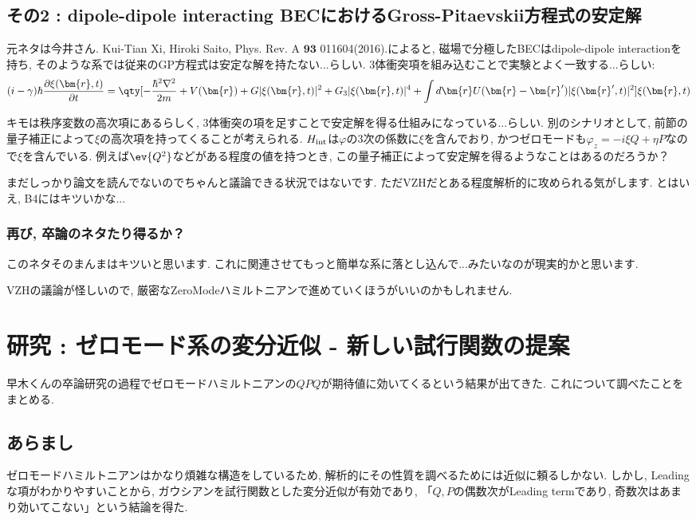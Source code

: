 \documentclass[10.5pt,a4paper]{jreport}
\begin{document}
\section{その2 : dipole-dipole interacting BECにおけるGross-Pitaevskii方程式の安定解}
元ネタは今井さん. {\rm Kui-Tian Xi, Hiroki Saito,  Phys. Rev. A $\bm{93}$ 011604(2016).}によると, 磁場で分極したBECはdipole-dipole interactionを持ち, そのような系では従来のGP方程式は安定な解を持たない...らしい. 3体衝突項を組み込むことで実験とよく一致する...らしい:
\begin{eqnarray}
  (i-\gamma )\hbar\frac{\partial \xi (\bm{r}, t)}{\partial t} = \qty[-\frac{\hbar^2\nabla^2}{2m} + V(\bm{r}) + G|\xi (\bm{r}, t)|^2 + G_3|\xi (\bm{r}, t)|^4 + \int d\bm{r} U(\bm{r} - \bm{r}')|\xi (\bm{r}', t)|^2]\xi (\bm{r}, t)
\end{eqnarray}

キモは秩序変数の高次項にあるらしく, 3体衝突の項を足すことで安定解を得る仕組みになっている...らしい. 別のシナリオとして, 前節の量子補正によって$\xi$の高次項を持ってくることが考えられる. $H_{\rm int}$は$\varphi$の3次の係数に$\xi$を含んでおり, かつゼロモードも$\varphi_z = -i\xi Q + \eta P$なので$\xi$を含んでいる. 例えば$\ev{Q^2}$などがある程度の値を持つとき, この量子補正によって安定解を得るようなことはあるのだろうか？

まだしっかり論文を読んでないのでちゃんと議論できる状況ではないです. ただVZHだとある程度解析的に攻められる気がします. とはいえ, B4にはキツいかな...
\subsection{再び, 卒論のネタたり得るか？}
このネタそのまんまはキツいと思います. これに関連させてもっと簡単な系に落とし込んで...みたいなのが現実的かと思います.

VZHの議論が怪しいので, 厳密なZeroModeハミルトニアンで進めていくほうがいいのかもしれません. 

\newpage

\chapter{研究 : ゼロモード系の変分近似 - 新しい試行関数の提案}
早木くんの卒論研究の過程でゼロモードハミルトニアンの$QPQ$が期待値に効いてくるという結果が出てきた. これについて調べたことをまとめる. 
\section{あらまし}
ゼロモードハミルトニアンはかなり煩雑な構造をしているため, 解析的にその性質を調べるためには近似に頼るしかない. しかし, Leadingな項がわかりやすいことから, ガウシアンを試行関数とした変分近似が有効であり, 「$Q, P$の偶数次がLeading termであり, 奇数次はあまり効いてこない」という結論を得た.
\end{document}
